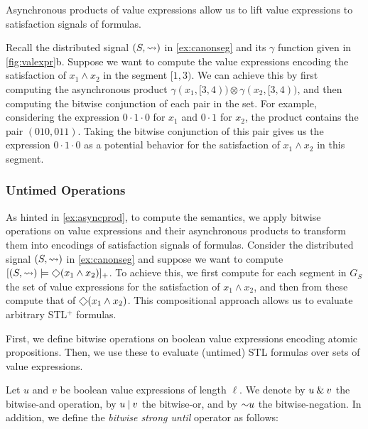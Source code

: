 Asynchronous products of value expressions allow us to lift value expressions to satisfaction signals of formulas.

\begin{example} \label{ex:asyncprod}
	Recall the distributed signal $(S, {\rightsquigarrow})$ in \cref{ex:canonseg} and its $\gamma$ function given in \cref{fig:valexpr}b.
	Suppose we want to compute the value expressions encoding the satisfaction of $x_1 \land x_2$ in the segment $[1,3)$.
	We can achieve this by first computing the asynchronous product $\gamma(x_1, [3,4)) \otimes \gamma(x_2, [3,4))$, and then computing the bitwise conjunction of each pair in the set.
	For example, considering the expression $0 \cdot 1 \cdot 0$ for $x_1$ and $0 \cdot 1$ for $x_2$, the product contains the pair $(010, 011)$.
	Taking the bitwise conjunction of this pair gives us the expression $0 \cdot 1 \cdot 0$ as a potential behavior for the satisfaction of $x_1 \land x_2$ in this segment.
\end{example}

\subsubsection{Untimed Operations}
As hinted in \cref{ex:asyncprod}, to compute the semantics, we apply bitwise operations on value expressions and their asynchronous products to transform them into encodings of satisfaction signals of formulas.
Consider the distributed signal $(S, {\rightsquigarrow})$ in \cref{ex:canonseg} and suppose we want to compute $[(S, {\hb}) \models \LTLeventually (x_1 \land x_2)]_+$.
To achieve this, we first compute for each segment in $G_S$ the set of value expressions for the satisfaction of $x_1 \land x_2$, and then from these compute that of $\LTLeventually (x_1 \land x_2)$.
This compositional approach allows us to evaluate arbitrary STL$^+$ formulas.

First, we define bitwise operations on boolean value expressions encoding atomic propositions.
Then, we use these to evaluate (untimed) STL formulas over sets of value expressions.

Let $u$ and $v$ be boolean value expressions of length $\ell$.
We denote by $u \mathbin{\&} v$ the bitwise-and operation, by $u \mathbin{|} v$ the bitwise-or, and by $\mathord{\sim} u$ the bitwise-negation.
In addition, we define the \emph{bitwise strong until} operator as follows:

